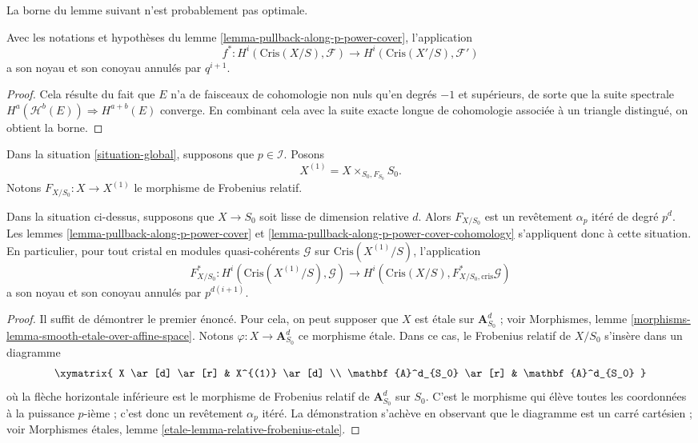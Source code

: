 \noindent
La borne du lemme suivant n'est probablement pas optimale.

\begin{lemma}
\label{lemma-pullback-along-p-power-cover-cohomology}
Avec les notations et hypothèses du
lemme \ref{lemma-pullback-along-p-power-cover},
l'application
$$
f^* :
H^i(\text{Cris}(X/S), \mathcal{F})
\longrightarrow
H^i(\text{Cris}(X'/S), \mathcal{F}')
$$
a son noyau et son conoyau annulés par $q^{i + 1}$.
\end{lemma}

\begin{proof}
Cela résulte du fait que $E$ n'a de faisceaux de cohomologie non nuls qu'en
degrés $-1$ et supérieurs, de sorte que la suite spectrale
$H^a(\mathcal{H}^b(E)) \Rightarrow H^{a + b}(E)$ converge.
En combinant cela avec la suite exacte longue de cohomologie associée
à un triangle distingué, on obtient la borne.
\end{proof}

\noindent
Dans la situation \ref{situation-global}, supposons que $p \in \mathcal{I}$.
Posons
$$
X^{(1)} = X \times_{S_0, F_{S_0}} S_0.
$$
Notons $F_{X/S_0} : X \to X^{(1)}$ le morphisme de Frobenius relatif.

\begin{lemma}
\label{lemma-pullback-relative-frobenius}
Dans la situation ci-dessus, supposons que $X \to S_0$ soit lisse de dimension
relative $d$. Alors $F_{X/S_0}$ est un revêtement $\alpha_p$ itéré
de degré $p^d$. Les lemmes \ref{lemma-pullback-along-p-power-cover} et
\ref{lemma-pullback-along-p-power-cover-cohomology} s'appliquent donc à cette
situation. En particulier, pour tout cristal en modules quasi-cohérents
$\mathcal{G}$ sur $\text{Cris}(X^{(1)}/S)$, l'application
$$
F_{X/S_0}^* : H^i(\text{Cris}(X^{(1)}/S), \mathcal{G})
\longrightarrow
H^i(\text{Cris}(X/S), F_{X/S_0, \text{cris}}^*\mathcal{G})
$$
a son noyau et son conoyau annulés par $p^{d(i + 1)}$.
\end{lemma}

\begin{proof}
Il suffit de démontrer le premier énoncé. Pour cela, on peut supposer
que $X$ est \'etale sur $\mathbf{A}^d_{S_0}$ ; voir
Morphismes, lemme \ref{morphisms-lemma-smooth-etale-over-affine-space}.
Notons $\varphi : X \to \mathbf{A}^d_{S_0}$ ce morphisme \'etale.
Dans ce cas, le Frobenius relatif de $X/S_0$ s'insère dans un diagramme
$$
\xymatrix{
X \ar[d] \ar[r] & X^{(1)} \ar[d] \\
\mathbf{A}^d_{S_0} \ar[r] & \mathbf{A}^d_{S_0}
}
$$
où la flèche horizontale inférieure est le morphisme de Frobenius relatif
de $\mathbf{A}^d_{S_0}$ sur $S_0$. C'est le morphisme qui élève
toutes les coordonnées à la puissance $p$-ième ; c'est donc un revêtement
$\alpha_p$ itéré. La démonstration s'achève en observant que le diagramme
est un carré cartésien ; voir
Morphismes \'etales, lemme \ref{etale-lemma-relative-frobenius-etale}.
\end{proof}













